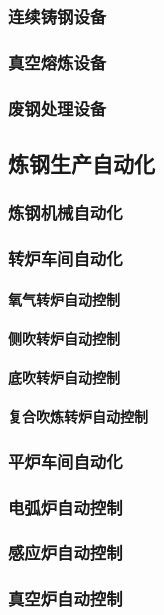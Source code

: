 \documentclass[UTF8]{../../ApplicationUniverse}
\begin{document}
        \subsubsection{连续铸钢设备}
        \subsubsection{真空熔炼设备}
        \subsubsection{废钢处理设备}
    \subsection{炼钢生产自动化}
        \subsubsection{炼钢机械自动化}
        \subsubsection{转炉车间自动化}
            \paragraph{氧气转炉自动控制}
            \paragraph{侧吹转炉自动控制}
            \paragraph{底吹转炉自动控制}
            \paragraph{复合吹炼转炉自动控制}
        \subsubsection{平炉车间自动化}
        \subsubsection{电弧炉自动控制}
        \subsubsection{感应炉自动控制}
        \subsubsection{真空炉自动控制}
\end{document}
